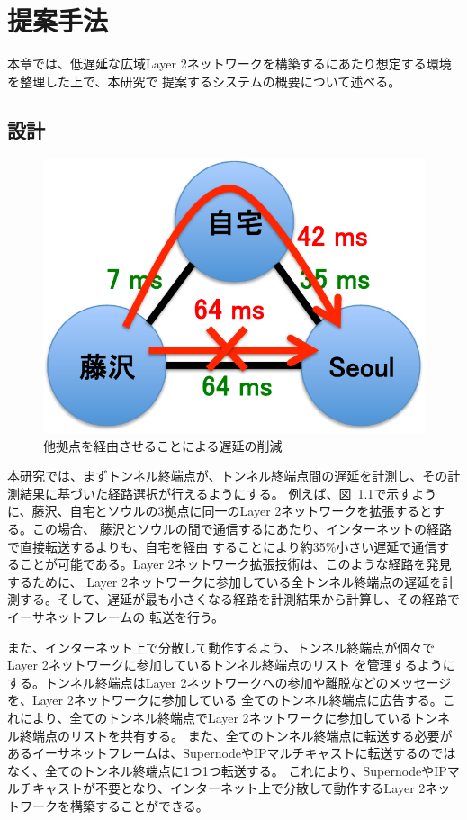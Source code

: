 \chapter{提案手法}
\label{solv}

本章では、低遅延な広域Layer 2ネットワークを構築するにあたり想定する環境を整理した上で、本研究で
提案するシステムの概要について述べる。

\section{設計}

\begin{figure}
	\begin{center}
		\includegraphics[scale=0.60]{./img/betterpath}
		\caption{他拠点を経由させることによる遅延の削減}
		\label{img:betterpath}
	\end{center}
\end{figure}

本研究では、まずトンネル終端点が、トンネル終端点間の遅延を計測し、その計測結果に基づいた経路選択が行えるようにする。
例えば、図~\ref{img:betterpath}で示すように、藤沢、自宅とソウルの3拠点に同一のLayer 2ネットワークを拡張するとする。この場合、
藤沢とソウルの間で通信するにあたり、インターネットの経路で直接転送するよりも、自宅を経由
することにより約35\%小さい遅延で通信することが可能である。Layer 2ネットワーク拡張技術は、このような経路を発見するために、
Layer 2ネットワークに参加している全トンネル終端点の遅延を計測する。そして、遅延が最も小さくなる経路を計測結果から計算し、その経路でイーサネットフレームの
転送を行う。

また、インターネット上で分散して動作するよう、トンネル終端点が個々でLayer 2ネットワークに参加しているトンネル終端点のリスト
を管理するようにする。トンネル終端点はLayer 2ネットワークへの参加や離脱などのメッセージを、Layer 2ネットワークに参加している
全てのトンネル終端点に広告する。これにより、全てのトンネル終端点でLayer 2ネットワークに参加しているトンネル終端点のリストを共有する。
また、全てのトンネル終端点に転送する必要があるイーサネットフレームは、SupernodeやIPマルチキャストに転送するのではなく、全てのトンネル終端点に1つ1つ転送する。
これにより、SupernodeやIPマルチキャストが不要となり、インターネット上で分散して動作するLayer 2ネットワークを構築することができる。


